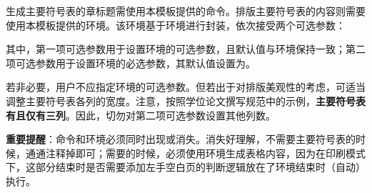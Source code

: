 \documentclass[print, doctor, vlined]{DissertUESTC}
\begin{document}
	
	
	\tableofcontents  %
	
	\listoffigures  %
	
	\listoftables  %
	
	\listofsymbs  %
	
	生成主要符号表的章标题需使用本模板提供的命令。排版主要符号表的内容则需要使用本模板提供的环境。该环境基于环境进行封装，依次接受两个可选参数：
	
	
	\noindent 其中，第一项可选参数用于设置环境的可选参数，且默认值与环境保持一致；第二项可选参数用于设置环境的必选参数，其默认值设置为。
	
	若非必要，用户不应指定环境的可选参数。但若出于对排版美观性的考虑，可适当调整主要符号表各列的宽度。注意，按照学位论文撰写规范中的示例，\textbf{主要符号表有且仅有三列}。因此，切勿对第二项可选参数设置其他列数。
	
	\textbf{重要提醒}：命令和环境必须同时出现或消失。消失好理解，不需要主要符号表的时候，通通注释掉即可；需要的时候，必须使用环境生成表格内容，因为在印刷模式下，这部分结束时是否需要添加左手空白页的判断逻辑放在了环境结束时（自动）执行。
	
\end{document}
